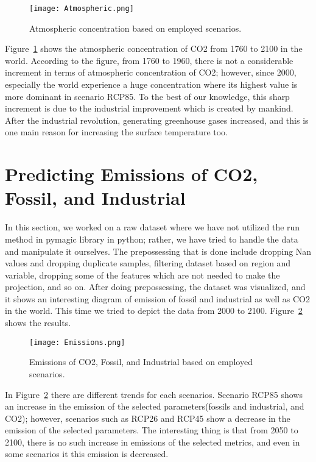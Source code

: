 \documentclass[12pt]{article}
\begin{document}
\begin{figure}[H]
\centering
\texttt{[image: Atmospheric.png]}
\caption{Atmospheric concentration based on employed scenarios.}
\label{fig:atomospheric}
\end{figure}

Figure~\ref{fig:atomospheric} shows the atmospheric concentration of CO2 from 1760 to 2100 in the world. According to the figure, from 1760 to 1960, there is not a considerable increment in terms of atmospheric concentration of CO2; however, since 2000, especially the world experience a huge concentration where its highest value is more dominant in scenario RCP85. To the best of our knowledge, this sharp increment is due to the industrial improvement which is created by mankind. After the industrial revolution, generating greenhouse gases increased, and this is one main reason for increasing the surface temperature too.




\section{Predicting Emissions of CO2, Fossil, and Industrial}
\label{lab:stemp}

In this section, we worked on a raw dataset where we have not utilized the run method in pymagic library in python; rather, we have tried to handle the data and manipulate it ourselves. The prepossessing that is done include dropping Nan values and dropping duplicate samples, filtering dataset based on region and variable, dropping some of the features which are not needed to make the projection, and so on. After doing prepossessing, the dataset was visualized, and it shows an interesting diagram of emission of fossil and industrial as well as CO2 in the world. This time we tried to depict the data from 2000 to 2100. Figure~\ref{fig:emission} shows the results.


\begin{figure}[H]
\centering
\texttt{[image: Emissions.png]}
\caption{Emissions of CO2, Fossil, and Industrial based on employed scenarios.}
\label{fig:emission}
\end{figure}

In Figure~\ref{fig:emission} there are different trends for each scenarios. Scenario RCP85 shows an increase in the emission of the selected parameters(fossils and industrial, and CO2); however, scenarios such as RCP26 and RCP45 show a decrease in the emission of the selected parameters. The interesting thing is that from 2050 to 2100, there is no such increase in emissions of the selected metrics, and even in some scenarios it this emission is decreased. 
\end{document}
